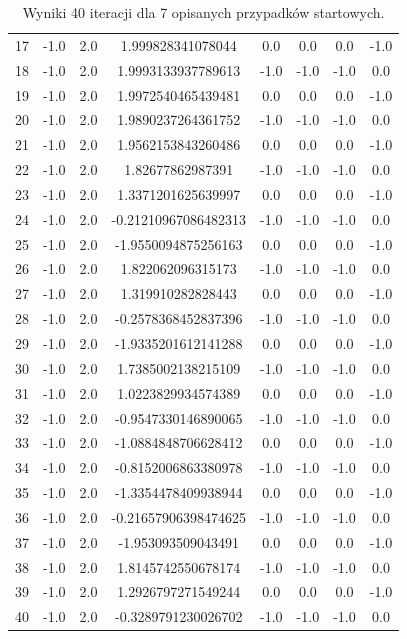 \documentclass[]{article}
\begin{document}
\begin{table}[h!]
\begin{tabular}{||c c c c c c c c||}
		17 & -1.0 & 2.0 & 1.999828341078044 & 0.0 & 0.0 & 0.0 & -1.0 \\
		18 & -1.0 & 2.0 & 1.9993133937789613 & -1.0 & -1.0 & -1.0 & 0.0 \\
		19 & -1.0 & 2.0 & 1.9972540465439481 & 0.0 & 0.0 & 0.0 & -1.0 \\
		20 & -1.0 & 2.0 & 1.9890237264361752 & -1.0 & -1.0 & -1.0 & 0.0 \\
		21 & -1.0 & 2.0 & 1.9562153843260486 & 0.0 & 0.0 & 0.0 & -1.0 \\
		22 & -1.0 & 2.0 & 1.82677862987391 & -1.0 & -1.0 & -1.0 & 0.0 \\
		23 & -1.0 & 2.0 & 1.3371201625639997 & 0.0 & 0.0 & 0.0 & -1.0 \\
		24 & -1.0 & 2.0 & -0.21210967086482313 & -1.0 & -1.0 & -1.0 & 0.0 \\
		25 & -1.0 & 2.0 & -1.9550094875256163 & 0.0 & 0.0 & 0.0 & -1.0 \\
		26 & -1.0 & 2.0 & 1.822062096315173 & -1.0 & -1.0 & -1.0 & 0.0 \\
		27 & -1.0 & 2.0 & 1.319910282828443 & 0.0 & 0.0 & 0.0 & -1.0 \\
		28 & -1.0 & 2.0 & -0.2578368452837396 & -1.0 & -1.0 & -1.0 & 0.0 \\
		29 & -1.0 & 2.0 & -1.9335201612141288 & 0.0 & 0.0 & 0.0 & -1.0 \\
		30 & -1.0 & 2.0 & 1.7385002138215109 & -1.0 & -1.0 & -1.0 & 0.0 \\
		31 & -1.0 & 2.0 & 1.0223829934574389 & 0.0 & 0.0 & 0.0 & -1.0 \\
		32 & -1.0 & 2.0 & -0.9547330146890065 & -1.0 & -1.0 & -1.0 & 0.0 \\
		33 & -1.0 & 2.0 & -1.0884848706628412 & 0.0 & 0.0 & 0.0 & -1.0 \\
		34 & -1.0 & 2.0 & -0.8152006863380978 & -1.0 & -1.0 & -1.0 & 0.0 \\
		35 & -1.0 & 2.0 & -1.3354478409938944 & 0.0 & 0.0 & 0.0 & -1.0 \\
		36 & -1.0 & 2.0 & -0.21657906398474625 & -1.0 & -1.0 & -1.0 & 0.0 \\
		37 & -1.0 & 2.0 & -1.953093509043491 & 0.0 & 0.0 & 0.0 & -1.0 \\
		38 & -1.0 & 2.0 & 1.8145742550678174 & -1.0 & -1.0 & -1.0 & 0.0 \\
		39 & -1.0 & 2.0 & 1.2926797271549244 & 0.0 & 0.0 & 0.0 & -1.0 \\
		40 & -1.0 & 2.0 & -0.3289791230026702 & -1.0 & -1.0 & -1.0 & 0.0 \\
		\hline
	\end{tabular}
	\caption{Wyniki 40 iteracji dla 7 opisanych przypadków startowych.}
\end{table}
\end{document}
